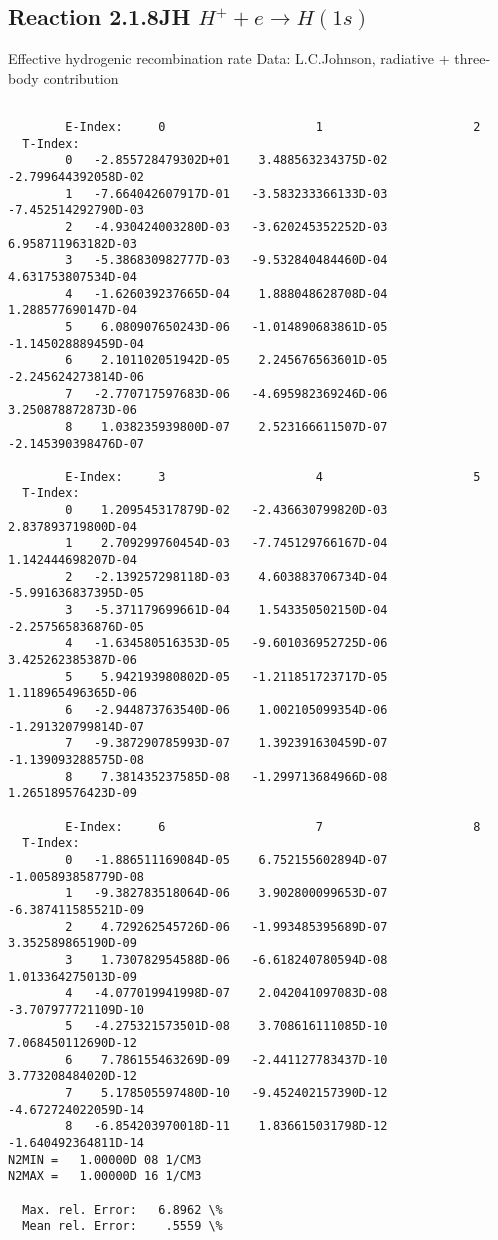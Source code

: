 \documentclass[12pt,dvipdfmx]{article}
\begin{document}
\subsection{
  Reaction 2.1.8JH  $ H^+ + e\rightarrow H(1s) $
}

   Effective hydrogenic recombination rate
   Data: L.C.Johnson, radiative + three-body contribution


\begin{small}\begin{verbatim}

        E-Index:     0                     1                     2
  T-Index:
        0   -2.855728479302D+01    3.488563234375D-02   -2.799644392058D-02
        1   -7.664042607917D-01   -3.583233366133D-03   -7.452514292790D-03
        2   -4.930424003280D-03   -3.620245352252D-03    6.958711963182D-03
        3   -5.386830982777D-03   -9.532840484460D-04    4.631753807534D-04
        4   -1.626039237665D-04    1.888048628708D-04    1.288577690147D-04
        5    6.080907650243D-06   -1.014890683861D-05   -1.145028889459D-04
        6    2.101102051942D-05    2.245676563601D-05   -2.245624273814D-06
        7   -2.770717597683D-06   -4.695982369246D-06    3.250878872873D-06
        8    1.038235939800D-07    2.523166611507D-07   -2.145390398476D-07

        E-Index:     3                     4                     5
  T-Index:
        0    1.209545317879D-02   -2.436630799820D-03    2.837893719800D-04
        1    2.709299760454D-03   -7.745129766167D-04    1.142444698207D-04
        2   -2.139257298118D-03    4.603883706734D-04   -5.991636837395D-05
        3   -5.371179699661D-04    1.543350502150D-04   -2.257565836876D-05
        4   -1.634580516353D-05   -9.601036952725D-06    3.425262385387D-06
        5    5.942193980802D-05   -1.211851723717D-05    1.118965496365D-06
        6   -2.944873763540D-06    1.002105099354D-06   -1.291320799814D-07
        7   -9.387290785993D-07    1.392391630459D-07   -1.139093288575D-08
        8    7.381435237585D-08   -1.299713684966D-08    1.265189576423D-09

        E-Index:     6                     7                     8
  T-Index:
        0   -1.886511169084D-05    6.752155602894D-07   -1.005893858779D-08
        1   -9.382783518064D-06    3.902800099653D-07   -6.387411585521D-09
        2    4.729262545726D-06   -1.993485395689D-07    3.352589865190D-09
        3    1.730782954588D-06   -6.618240780594D-08    1.013364275013D-09
        4   -4.077019941998D-07    2.042041097083D-08   -3.707977721109D-10
        5   -4.275321573501D-08    3.708616111085D-10    7.068450112690D-12
        6    7.786155463269D-09   -2.441127783437D-10    3.773208484020D-12
        7    5.178505597480D-10   -9.452402157390D-12   -4.672724022059D-14
        8   -6.854203970018D-11    1.836615031798D-12   -1.640492364811D-14
N2MIN =   1.00000D 08 1/CM3
N2MAX =   1.00000D 16 1/CM3

  Max. rel. Error:   6.8962 \%
  Mean rel. Error:    .5559 \%


\end{verbatim}\end{small}
\end{document}
